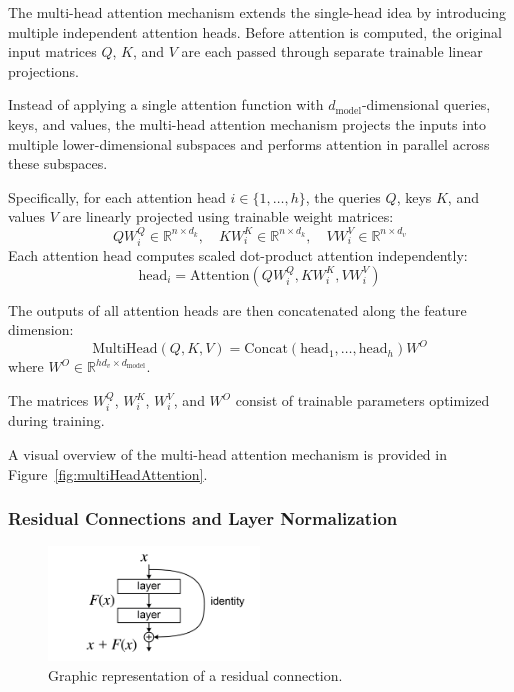 \documentclass{pracalicmgr}
\begin{document}
The multi-head attention mechanism extends the single-head idea by introducing multiple independent attention heads. Before attention is computed, the original input matrices \( Q \), \( K \), and \( V \) are each passed through separate trainable linear projections.

Instead of applying a single attention function with \( d_{\text{model}} \)-dimensional queries, keys, and values, the multi-head attention mechanism projects the inputs into multiple lower-dimensional subspaces and performs attention in parallel across these subspaces.

Specifically, for each attention head \( i \in \{1, \dots, h\} \), the queries \( Q \), keys \( K \), and values \( V \) are linearly projected using trainable weight matrices:
\[
QW_i^Q \in \mathbb{R}^{n \times d_k}, \quad KW_i^K \in \mathbb{R}^{n \times d_k}, \quad VW_i^V \in \mathbb{R}^{n \times d_v}
\]
Each attention head computes scaled dot-product attention independently:
\[
\text{head}_i = \text{Attention}(QW_i^Q, KW_i^K, VW_i^V)
\]

The outputs of all attention heads are then concatenated along the feature dimension:
\[
\text{MultiHead}(Q, K, V) = \text{Concat}(\text{head}_1, \ldots, \text{head}_h)W^O
\]
where \( W^O \in \mathbb{R}^{hd_v \times d_{\text{model}}} \).

The matrices \( W^Q_i \), \( W^K_i \), \( W^V_i \), and \( W^O \) consist of trainable parameters optimized during training.

A visual overview of the multi-head attention mechanism is provided in Figure~\ref{fig:multiHeadAttention}.

\subsubsection{Residual Connections and Layer Normalization}

\begin{figure}[h]
    \centering
    \includegraphics[width=0.5\textwidth]{src/ResBlock.png}
    \caption{Graphic representation of a residual connection\cite{resConn}.}
    \label{fig:resCon}
\end{figure}
\end{document}
